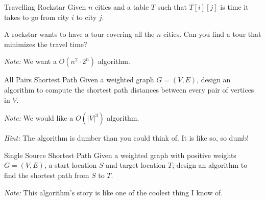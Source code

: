 \documentclass{beamer}
\begin{document}
\begin{frame}{}
\end{frame}
\begin{frame}{}
\end{frame}

\begin{frame}{Travelling Rockstar}
Given $n$ cities and a table $T$ such that $T[i][j]$ is time it takes to go from city $i$ to city $j$.

\medskip
A rockstar wants to have a tour covering all the $n$ cities. Can you find a tour that minimizes the travel time?

\medskip
\textit{Note:} We want a $O(n^2 \cdot 2^n)$ algorithm.
\end{frame}

\begin{frame}{}
\end{frame}
\begin{frame}{}
\end{frame}

\begin{frame}{All Pairs Shortest Path}
Given a weighted graph $G = (V, E)$, design an algorithm to compute the shortest path distances between every pair of vertices in $V$.

\medskip
\textit{Note:} We would like a $O(|V|^3)$ algorithm.

\medskip
\textit{Hint:} The algorithm is dumber than you could think of. It is like so, so dumb!
\end{frame}

\begin{frame}{}
\end{frame}
\begin{frame}{}
\end{frame}

\begin{frame}{Single Source Shortest Path}
Given a weighted graph with positive weights $G = (V, E)$, a start location $S$ and target location $T$; design an algorithm to find the shortest path from $S$ to $T$.

\medskip
\textit{Note:} This algorithm's story is like one of the coolest thing I know of.
\end{frame}

\begin{frame}{}
\end{frame}
\begin{frame}{}
\end{frame}
\end{document}
